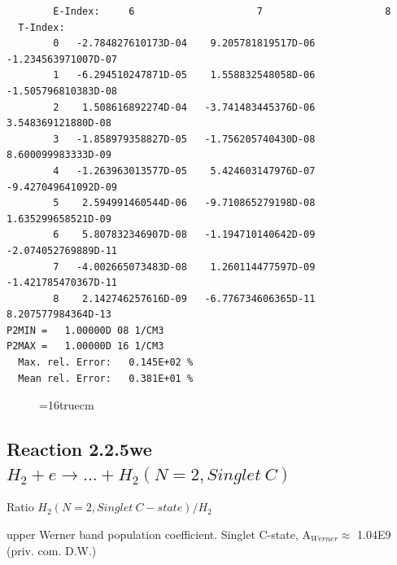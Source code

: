 \documentclass[12pt,dvipdfmx]{article}
\begin{document}
\begin{small}
\begin{verbatim}
        E-Index:     6                     7                     8
  T-Index:
        0   -2.784827610173D-04    9.205781819517D-06   -1.234563971007D-07
        1   -6.294510247871D-05    1.558832548058D-06   -1.505796810383D-08
        2    1.508616892274D-04   -3.741483445376D-06    3.548369121880D-08
        3   -1.858979358827D-05   -1.756205740430D-08    8.600099983333D-09
        4   -1.263963013577D-05    5.424603147976D-07   -9.427049641092D-09
        5    2.594991460544D-06   -9.710865279198D-08    1.635299658521D-09
        6    5.807832346907D-08   -1.194710140642D-09   -2.074052769889D-11
        7   -4.002665073483D-08    1.260114477597D-09   -1.421785470367D-11
        8    2.142746257616D-09   -6.776734606365D-11    8.207577984364D-13
P2MIN =   1.00000D 08 1/CM3
P2MAX =   1.00000D 16 1/CM3
  Max. rel. Error:   0.145E+02 %
  Mean rel. Error:   0.381E+01 %

\end{verbatim}\end{small}
\begin{figure} \label{2.2.5fu}
\epsfxsize=16truecm
\end{figure}

\newpage

\subsection{
Reaction 2.2.5we $H_2 + e \rightarrow ...+ H_2(N=2,Singlet \ C)$}

Ratio $H_2(N=2, Singlet \ C-state)/H_2 $

upper Werner band population coefficient. Singlet C-state, A$_{Werner} \approx $ 1.04E9 (priv. com. D.W.)
\end{document}
